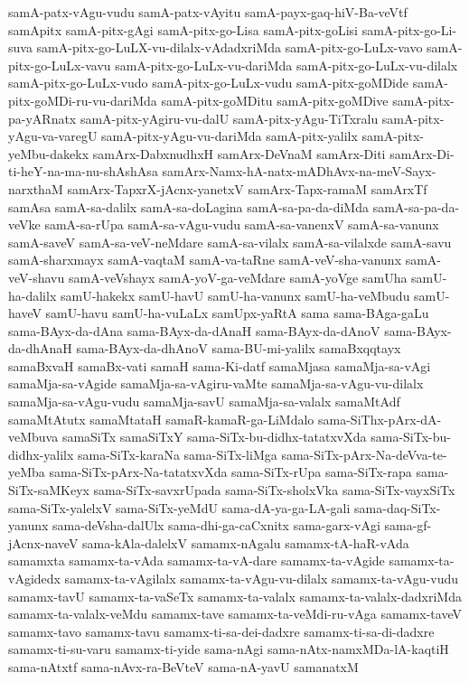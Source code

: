 {samA-patx-vAgu-vudu
samA-patx-vAyitu
samA-payx-gaq-hiV-Ba-veVtf
samApitx
samA-pitx-gAgi
samA-pitx-go-Lisa
samA-pitx-goLisi
samA-pitx-go-Li-suva
samA-pitx-go-LuLX-vu-dilalx-vAdadxriMda
samA-pitx-go-LuLx-vavo
samA-pitx-go-LuLx-vavu
samA-pitx-go-LuLx-vu-dariMda
samA-pitx-go-LuLx-vu-dilalx
samA-pitx-go-LuLx-vudo
samA-pitx-go-LuLx-vudu
samA-pitx-goMDide
samA-pitx-goMDi-ru-vu-dariMda
samA-pitx-goMDitu
samA-pitx-goMDive
samA-pitx-pa-yARnatx
samA-pitx-yAgiru-vu-dalU
samA-pitx-yAgu-TiTxralu
samA-pitx-yAgu-va-varegU
samA-pitx-yAgu-vu-dariMda
samA-pitx-yalilx
samA-pitx-yeMbu-dakekx
samArx-DabxnudhxH
samArx-DeVnaM
samArx-Diti
samArx-Di-ti-heY-na-ma-nu-shAshAsa
samArx-Namx-hA-natx-mADhAvx-na-meV-Sayx-narxthaM
samArx-TapxrX-jAcnx-yanetxV
samArx-Tapx-ramaM
samArxTf
samAsa
samA-sa-dalilx
samA-sa-doLagina
samA-sa-pa-da-diMda
samA-sa-pa-da-veVke
samA-sa-rUpa
samA-sa-vAgu-vudu
samA-sa-vanenxV
samA-sa-vanunx
samA-saveV
samA-sa-veV-neMdare
samA-sa-vilalx
samA-sa-vilalxde
samA-savu
samA-sharxmayx
samA-vaqtaM
samA-va-taRne
samA-veV-sha-vanunx
samA-veV-shavu
samA-veVshayx
samA-yoV-ga-veMdare
samA-yoVge
samUha
samU-ha-dalilx
samU-hakekx
samU-havU
samU-ha-vanunx
samU-ha-veMbudu
samU-haveV
samU-havu
samU-ha-vuLaLx
samUpx-yaRtA
sama
sama-BAga-gaLu
sama-BAyx-da-dAna
sama-BAyx-da-dAnaH
sama-BAyx-da-dAnoV
sama-BAyx-da-dhAnaH
sama-BAyx-da-dhAnoV
sama-BU-mi-yalilx
samaBxqqtayx
samaBxvaH
samaBx-vati
samaH
sama-Ki-datf
samaMjasa
samaMja-sa-vAgi
samaMja-sa-vAgide
samaMja-sa-vAgiru-vaMte
samaMja-sa-vAgu-vu-dilalx
samaMja-sa-vAgu-vudu
samaMja-savU
samaMja-sa-valalx
samaMtAdf
samaMtAtutx
samaMtataH
samaR-kamaR-ga-LiMdalo
sama-SiThx-pArx-dA-veMbuva
samaSiTx
samaSiTxY
sama-SiTx-bu-didhx-tatatxvXda
sama-SiTx-bu-didhx-yalilx
sama-SiTx-karaNa
sama-SiTx-liMga
sama-SiTx-pArx-Na-deVva-te-yeMba
sama-SiTx-pArx-Na-tatatxvXda
sama-SiTx-rUpa
sama-SiTx-rapa
sama-SiTx-saMKeyx
sama-SiTx-savxrUpada
sama-SiTx-sholxVka
sama-SiTx-vayxSiTx
sama-SiTx-yalelxV
sama-SiTx-yeMdU
sama-dA-ya-ga-LA-gali
sama-daq-SiTx-yanunx
sama-deVsha-dalUlx
sama-dhi-ga-caCxnitx
sama-garx-vAgi
sama-gf-jAcnx-naveV
sama-kAla-dalelxV
samamx-nAgalu
samamx-tA-haR-vAda
samamxta
samamx-ta-vAda
samamx-ta-vA-dare
samamx-ta-vAgide
samamx-ta-vAgidedx
samamx-ta-vAgilalx
samamx-ta-vAgu-vu-dilalx
samamx-ta-vAgu-vudu
samamx-tavU
samamx-ta-vaSeTx
samamx-ta-valalx
samamx-ta-valalx-dadxriMda
samamx-ta-valalx-veMdu
samamx-tave
samamx-ta-veMdi-ru-vAga
samamx-taveV
samamx-tavo
samamx-tavu
samamx-ti-sa-dei-dadxre
samamx-ti-sa-di-dadxre
samamx-ti-su-varu
samamx-ti-yide
sama-nAgi
sama-nAtx-namxMDa-lA-kaqtiH
sama-nAtxtf
sama-nAvx-ra-BeVteV
sama-nA-yavU
samanatxM
}
